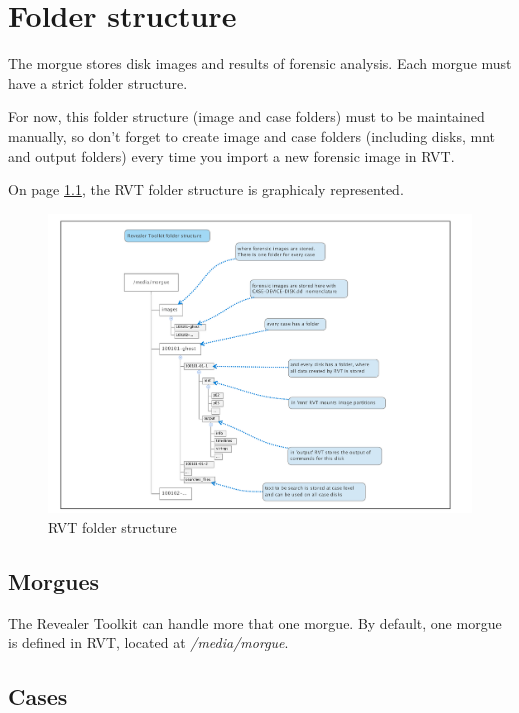 \documentclass[a4paper,11pt,oneside]{report}
\begin{document}

\chapter{Folder structure}

The morgue stores disk images and results of forensic analysis. Each morgue must have a strict folder structure. 

For now, this folder structure (image and case folders) must to be maintained manually, so don't forget to create image and case folders (including disks, mnt and output folders) every time you import a new forensic image in RVT.

On page \ref{img:folderstructure}, the RVT folder structure is graphicaly represented.

\begin{figure}[p]
\centering
\includegraphics[width=\textheight,angle=270]{images/RVT_folder_structure.pdf} 
\caption{RVT folder structure} \label{img:folderstructure}
\end{figure}



\section{Morgues}

The Revealer Toolkit can handle more that one morgue. By default, one morgue is defined in RVT, located at \emph{/media/morgue}. 



\section{Cases}
\end{document}
